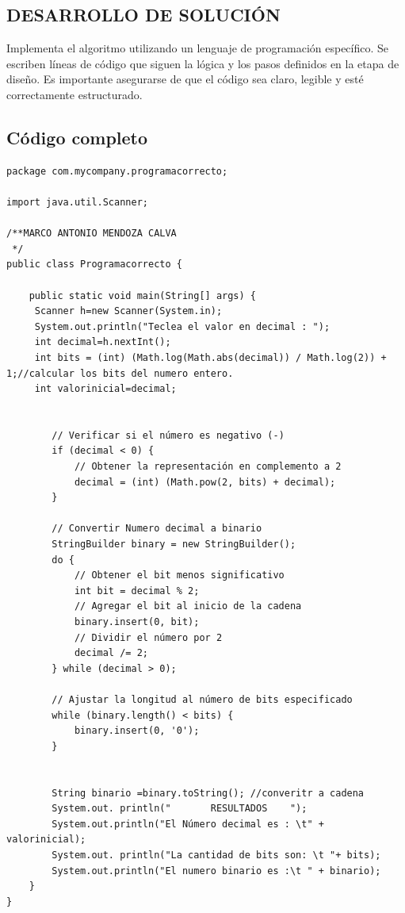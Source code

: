 \subsection{\textbf{DESARROLLO DE SOLUCIÓN }}
Implementa el algoritmo utilizando un lenguaje de programación específico. Se escriben líneas de código que siguen la lógica y los pasos definidos en la etapa de diseño. Es importante asegurarse de que el código sea claro, legible y esté correctamente estructurado.
\subsection{\textbf{Código completo}}
\begin{lstlisting}[style=javaStyle]
package com.mycompany.programacorrecto;

import java.util.Scanner;

/**MARCO ANTONIO MENDOZA CALVA
 */
public class Programacorrecto {

    public static void main(String[] args) {
     Scanner h=new Scanner(System.in);
     System.out.println("Teclea el valor en decimal : ");
     int decimal=h.nextInt();
     int bits = (int) (Math.log(Math.abs(decimal)) / Math.log(2)) + 1;//calcular los bits del numero entero.
     int valorinicial=decimal;    
    
       
        // Verificar si el número es negativo (-)
        if (decimal < 0) {
            // Obtener la representación en complemento a 2
            decimal = (int) (Math.pow(2, bits) + decimal);
        }

        // Convertir Numero decimal a binario
        StringBuilder binary = new StringBuilder();
        do {
            // Obtener el bit menos significativo
            int bit = decimal % 2;
            // Agregar el bit al inicio de la cadena
            binary.insert(0, bit);
            // Dividir el número por 2
            decimal /= 2;
        } while (decimal > 0);

        // Ajustar la longitud al número de bits especificado
        while (binary.length() < bits) {
            binary.insert(0, '0');
        }

        
        String binario =binary.toString(); //converitr a cadena 
        System.out. println("       RESULTADOS    ");
        System.out.println("El Número decimal es : \t" + valorinicial);
        System.out. println("La cantidad de bits son: \t "+ bits);
        System.out.println("El numero binario es :\t " + binario);
    }       
}

\end{lstlisting}


